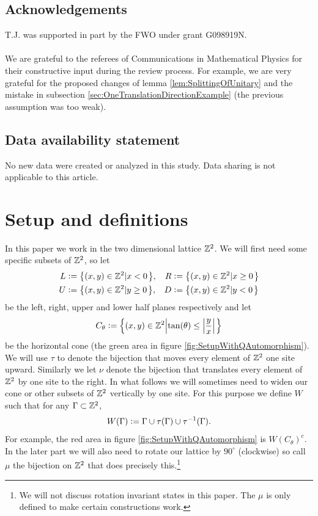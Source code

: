 \documentclass[12pt,a4paper,twoside]{article}
\numberwithin{equation}{section}
\begin{document}
\subsection*{Acknowledgements}
T.J. was supported in part by the FWO under grant G098919N.\\\\
We are grateful to the referees of Communications in Mathematical Physics for their constructive input during the review process. For example, we are very grateful for the proposed changes of lemma \ref{lem:SplittingOfUnitary} and the mistake in subsection \ref{sec:OneTranslationDirectionExample} (the previous assumption was too weak).
\subsection*{Data availability statement}
No new data were created or analyzed in this study. Data sharing is not applicable to this article.
\clearpage
\section{Setup and definitions}\label{sec:Setup}
In this paper we work in the two dimensional lattice $\mathbb Z^2$. We will first need some specific subsets of $\mathbb Z^2$, so let
\begin{align}
	L&\defeq \left\{(x,y)\in\ZZ^2\left|x<0\right.\right\},&R&\defeq \left\{(x,y)\in\ZZ^2\left|x\geq 0\right.\right\}\\
	U&\defeq \left\{(x,y)\in\ZZ^2\left|y\geq 0\right.\right\},&D&\defeq \left\{(x,y)\in\ZZ^2\left|y<0\right.\right\}
\end{align}
be the left, right, upper and lower half planes respectively and let
\begin{equation}
	C_\theta\defeq \left\{(x,y)\in\ZZ^2\left|\tan(\theta)\leq\abs{\frac{y}{x}}\right.\right\}
\end{equation}
be the horizontal cone (the green area in figure \ref{fig:SetupWithQAutomorphism}). We will use $\tau$ to denote the bijection that moves every element of $\mathbb Z^2$ one site upward. Similarly we let $\nu$ denote the bijection that translates every element of $\mathbb Z^2$ by one site to the right. In what follows we will sometimes need to widen our cone or other subsets of $\mathbb Z^2$ vertically by one site. For this purpose we define $W$ such that for any $\Gamma\subset\mathbb Z^2$,
\begin{equation}
	W(\Gamma)\vcentcolon= \Gamma\cup\tau(\Gamma)\cup\tau^{-1}(\Gamma).
\end{equation}
For example, the red area in figure \ref{fig:SetupWithQAutomorphism} is $W(C_\theta)^c$. In the later part we will also need to rotate our lattice by $90^\circ$ (clockwise) so call $\mu$ the bijection on $\mathbb Z^2$ that does precisely this.\footnote{We will not discuss rotation invariant states in this paper. The $\mu$ is only defined to make certain constructions work.}
\end{document}
